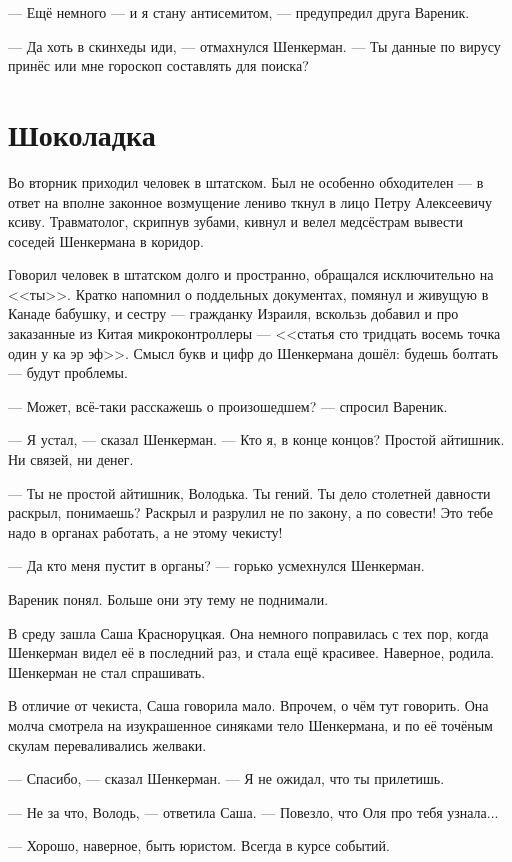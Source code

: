 \documentclass[a4paper,10pt,fleqn]{book}\usepackage{polyglossia}\setdefaultlanguage{english}\setotherlanguage{russian}\defaultfontfeatures{Ligatures=TeX,Mapping=tex-text} \usepackage{xcolor}\definecolor{lightgray}{HTML}{bbbbbb}\color{lightgray}\newcommand{\ml}[3]{\textcolor{black}{#3}}
\begin{document}
--- Ещё немного --- и я стану антисемитом, --- предупредил друга Вареник.

--- Да хоть в скинхеды иди, --- отмахнулся Шенкерман.
--- Ты данные по вирусу принёс или мне гороскоп составлять для поиска?

\section{Шоколадка}

Во вторник приходил человек в штатском.
Был не особенно обходителен --- в ответ на вполне законное возмущение лениво ткнул в лицо Петру Алексеевичу ксиву.
Травматолог, скрипнув зубами, кивнул и велел медсёстрам вывести соседей Шенкермана в коридор.

Говорил человек в штатском долго и пространно, обращался исключительно на <<ты>>.
Кратко напомнил о поддельных документах, помянул и живущую в Канаде бабушку, и сестру --- гражданку Израиля, вскользь добавил и про заказанные из Китая микроконтроллеры --- <<статья сто тридцать восемь точка один у ка эр эф>>.
Смысл букв и цифр до Шенкермана дошёл: будешь болтать --- будут проблемы.

--- Может, всё-таки расскажешь о произошедшем? --- спросил Вареник.

--- Я устал, --- сказал Шенкерман.
--- Кто я, в конце концов?
Простой айтишник.
Ни связей, ни денег.

--- Ты не простой айтишник, Володька.
Ты гений.
Ты дело столетней давности раскрыл, понимаешь?
Раскрыл и разрулил не по закону, а по совести!
Это тебе надо в органах работать, а не этому чекисту!

--- Да кто меня пустит в органы? --- горько усмехнулся Шенкерман.

Вареник понял.
Больше они эту тему не поднимали.

В среду зашла Саша Красноруцкая.
Она немного поправилась с тех пор, когда Шенкерман видел её в последний раз, и стала ещё красивее.
Наверное, родила.
Шенкерман не стал спрашивать.

В отличие от чекиста, Саша говорила мало.
Впрочем, о чём тут говорить.
Она молча смотрела на изукрашенное синяками тело Шенкермана, и по её точёным скулам переваливались желваки.

--- Спасибо, --- сказал Шенкерман.
--- Я не ожидал, что ты прилетишь.

--- Не за что, Володь, --- ответила Саша.
--- Повезло, что Оля про тебя узнала...

--- Хорошо, наверное, быть юристом.
Всегда в курсе событий.
\end{document}
